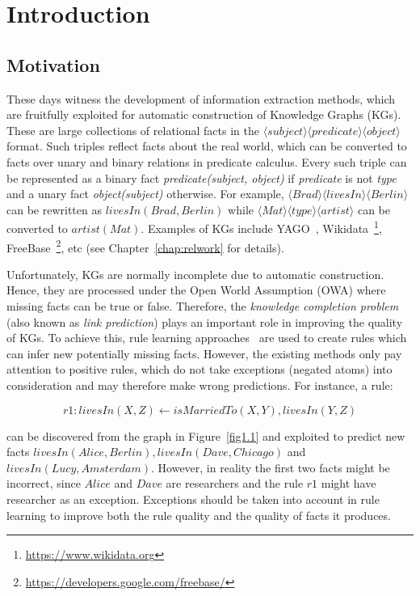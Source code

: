 \chapter{Introduction}
\label{chap:intro}

\section{Motivation}
\label{chap:motivation}

These days witness the development of information extraction methods, which are fruitfully exploited for automatic construction of Knowledge Graphs (KGs). These are large collections of relational facts in the $\langle subject \rangle \langle predicate \rangle \langle object \rangle$ format. Such triples reflect facts about the real world, which can be converted to facts over unary and binary relations in predicate calculus. Every such triple can be represented as a binary fact \textit{predicate(subject, object)} if \textit{predicate} is not \textit{type} and a unary fact \textit{object(subject)} otherwise. For example, $\langle Brad \rangle \langle livesIn \rangle \langle Berlin \rangle$ can be rewritten as $livesIn(Brad, Berlin)$ while $\langle Mat \rangle \langle type \rangle \langle artist \rangle$ can be converted to $artist(Mat)$. Examples of KGs include YAGO~\cite{ref28}, Wikidata~\footnote{\url{https://www.wikidata.org}}, FreeBase~\footnote{\url{https://developers.google.com/freebase/}}, etc (see Chapter~\ref{chap:relwork} for details).

Unfortunately, KGs are normally incomplete due to automatic construction. Hence, they are processed under the Open World Assumption (OWA) where missing facts can be true or false. Therefore, the \textit{knowledge completion problem} (also known as \textit{link prediction}) plays an important role in improving the quality of KGs. To achieve this, rule learning approaches~\cite{ref39, ref10} are used to create rules which can infer new potentially missing facts. However, the existing methods only pay attention to positive rules, which do not take exceptions (negated atoms) into consideration and may therefore make wrong predictions. For instance, a rule:

\begin{equation}
r1: livesIn(X,Z) \leftarrow isMarriedTo(X,Y), livesIn(Y,Z)
\end{equation}
\label{rule1}

\noindent can be discovered from the graph in Figure~\ref{fig1.1} and exploited to predict new facts $livesIn(Alice, Berlin), livesIn(Dave, Chicago)$ and $livesIn(Lucy, Amsterdam)$. However, in reality the first two facts might be incorrect, since $Alice$ and $Dave$ are researchers and the rule $r1$ might have researcher as an exception. Exceptions should be taken into account in rule learning to improve both the rule quality and the quality of facts it produces.

